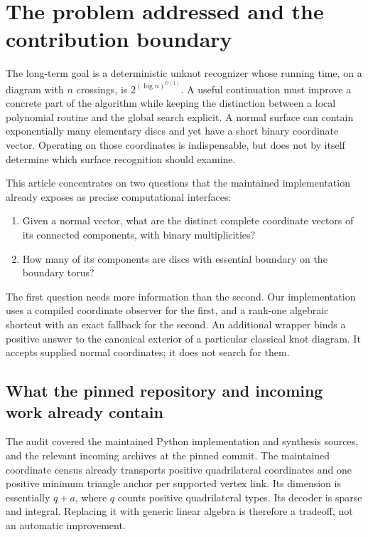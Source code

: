 \documentclass[11pt,a4paper]{article}
\theoremstyle{definition}
\begin{document}
\clearpage
\begingroup
\small
\tableofcontents
\endgroup
\newpage

\section{The problem addressed and the contribution boundary}
\label{sec:scope}

The long-term goal is a deterministic unknot recognizer whose running time,
on a diagram with $n$ crossings, is $2^{(\log n)^{O(1)}}$.  A useful continuation
must improve a concrete part of the algorithm while keeping the distinction
between a local polynomial routine and the global search explicit.  A normal
surface can contain exponentially many elementary discs and yet have a short
binary coordinate vector.  Operating on those coordinates is indispensable,
but does not by itself determine which surface recognition should examine.

This article concentrates on two questions that the maintained implementation
already exposes as precise computational interfaces:
\begin{enumerate}
\item Given a normal vector, what are the distinct complete coordinate vectors
of its connected components, with binary multiplicities?
\item How many of its components are discs with essential boundary on the
boundary torus?
\end{enumerate}
The first question needs more information than the second.  Our implementation
uses a compiled coordinate observer for the first, and a rank-one algebraic
shortcut with an exact fallback for the second.  An additional wrapper binds
a positive answer to the canonical exterior of a particular classical knot
diagram.  It accepts supplied normal coordinates; it does not search for them.

\subsection{What the pinned repository and incoming work already contain}

The audit covered the maintained Python implementation and synthesis sources,
and the relevant incoming archives at the pinned commit.  The maintained
coordinate census already transports positive quadrilateral coordinates and
one positive minimum triangle anchor per supported vertex link.  Its dimension
is essentially $q+a$, where $q$ counts positive quadrilateral types.  Its
decoder is sparse and integral.  Replacing it with generic linear algebra is
therefore a tradeoff, not an automatic improvement.
\end{document}
